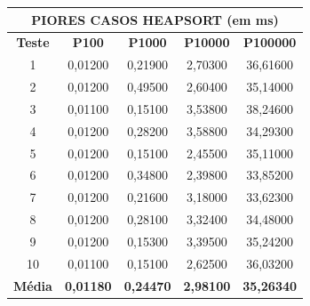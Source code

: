 \documentclass[a4paper, 12pt]{article}
\begin{document}
\begin{minipage}{1.05\textwidth}
 \begin{minipage}[c]{0.46\textwidth}
 \centering 
\begin{tabular}{ccccc}

     \multicolumn{ 5}{c}{{\bf PIORES CASOS HEAPSORT (em ms)}} \\
\hline
{\bf Teste} & {\bf P100} & {\bf P1000} & {\bf P10000} & {\bf P100000} \\
\hline
         1 &    0,01200 &    0,21900 &    2,70300 &   36,61600 \\
\hline
         2 &    0,01200 &    0,49500 &    2,60400 &   35,14000 \\
\hline
         3 &    0,01100 &    0,15100 &    3,53800 &   38,24600 \\
\hline
         4 &    0,01200 &    0,28200 &    3,58800 &   34,29300 \\
\hline
         5 &    0,01200 &    0,15100 &    2,45500 &   35,11000 \\
\hline
         6 &    0,01200 &    0,34800 &    2,39800 &   33,85200 \\
\hline
         7 &    0,01200 &    0,21600 &    3,18000 &   33,62300 \\
\hline
         8 &    0,01200 &    0,28100 &    3,32400 &   34,48000 \\
\hline
         9 &    0,01200 &    0,15300 &    3,39500 &   35,24200 \\
\hline
        10 &    0,01100 &    0,15100 &    2,62500 &   36,03200 \\
\hline
{\bf Média} & {\bf 0,01180} & {\bf 0,24470} & {\bf 2,98100} & {\bf 35,26340} \\
\hline
\end{tabular}  
\end{minipage}\hfill
\begin{minipage}[c]{0.49\textwidth}
\centering
{}
\end{minipage}
\end{minipage}\hfill
\vspace{0.8cm}
\end{document}
